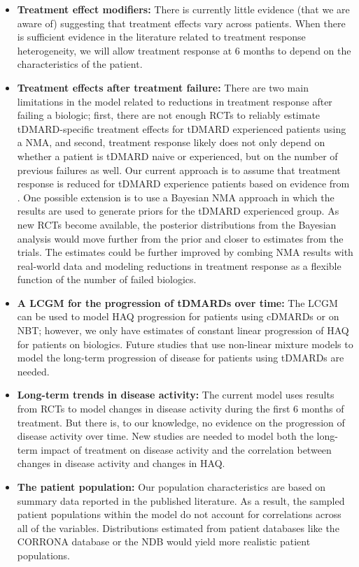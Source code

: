 \documentclass[11pt,final,fleqn]{article}\usepackage[]{graphicx}\usepackage[]{color}
\theoremstyle{plain}
\begin{document}
\begin{itemize}
\item \textbf{Treatment effect modifiers:} There is currently little evidence (that we are aware of) suggesting that treatment effects vary across patients. When there is sufficient evidence in the literature related to treatment response heterogeneity, we will allow treatment response at 6 months to depend on the characteristics of the patient.  
\item \textbf{Treatment effects after treatment failure:} There are two main limitations in the model related to reductions in treatment response after failing a biologic; first, there are not enough RCTs to reliably estimate tDMARD-specific treatment effects for tDMARD experienced patients using a NMA, and second, treatment response likely does not only depend on whether a patient is tDMARD naive or experienced, but on the number of previous failures as well. Our current approach is to assume that treatment response is reduced for tDMARD experience patients based on evidence from \citet{carlson2015economic}. One possible extension is to use a Bayesian NMA approach in which the \citet{carlson2015economic} results are used to generate priors for the tDMARD experienced group. As new RCTs become available, the posterior distributions from the Bayesian analysis would move further from the prior and closer to estimates from the trials. The estimates could be further improved by combing NMA results with real-world data and modeling reductions in treatment response as a flexible function of the number of failed biologics. 
\item \textbf{A LCGM for the progression of tDMARDs over time:} The LCGM can be used to model HAQ progression for patients using cDMARDs or on NBT; however, we only have estimates of constant linear progression of HAQ for patients on biologics. Future studies that use non-linear mixture models to model the long-term progression of disease for patients using tDMARDs are needed. 
\item \textbf{Long-term trends in disease activity:} The current model uses results from RCTs to model changes in disease activity during the first 6 months of treatment. But there is, to our knowledge, no evidence on the progression of disease activity over time. New studies are needed to model both the long-term impact of treatment on disease activity and the correlation between changes in disease activity and changes in HAQ.
\item \textbf{The patient population:} Our population characteristics are based on summary data reported in the published literature. As a result, the sampled patient populations within the model do not account for correlations across all of the variables. Distributions estimated from patient databases like the CORRONA database or the NDB would yield more realistic patient populations. 

\end{itemize}
\end{document}
